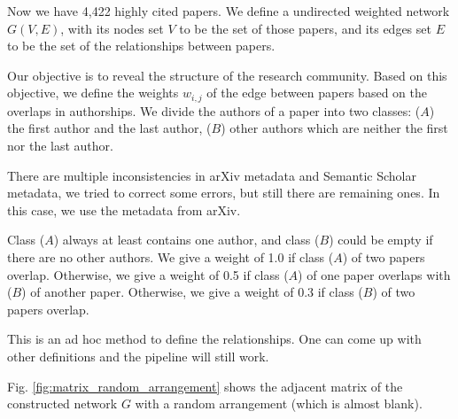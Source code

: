 Now we have 4,422 highly cited papers.
We define a undirected weighted network $G(V,E)$, with its nodes set $V$ to be the set of those papers, and its edges set $E$ to be the set of the relationships between papers.

Our objective is to reveal the structure of the research community.
Based on this objective, we define the weights $w_{i,j}$ of the edge between papers based on the overlaps in authorships.
We divide the authors of a paper into two classes: ($A$) the first author and the last author, ($B$) other authors which are neither the first nor the last author.

There are multiple inconsistencies in arXiv metadata and Semantic Scholar metadata, we tried to correct some errors, but still there are remaining ones.
In this case, we use the metadata from arXiv.

Class ($A$) always at least contains one author, and class ($B$) could be empty if there are no other authors.
We give a weight of 1.0 if class ($A$) of two papers overlap.
Otherwise, we give a weight of 0.5 if class ($A$) of one paper overlaps with ($B$) of another paper.
Otherwise, we give a weight of 0.3 if class ($B$) of two papers overlap.

This is an ad hoc method to define the relationships.
One can come up with other definitions and the pipeline will still work.

Fig. \ref{fig:matrix_random_arrangement} shows the adjacent matrix of the constructed network $G$ with a random arrangement (which is almost blank).

